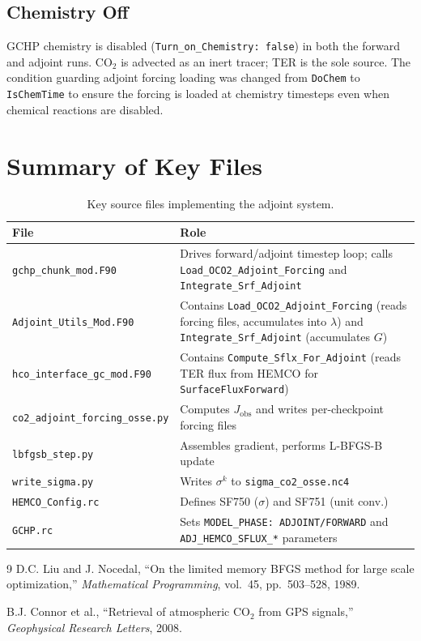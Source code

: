 \documentclass[12pt]{article}
\begin{document}
\subsection{Chemistry Off}

GCHP chemistry is disabled (\texttt{Turn\_on\_Chemistry: false}) in both the
forward and adjoint runs. CO$_2$ is advected as an inert tracer; TER is the
sole source. The condition guarding adjoint forcing loading was changed from
\texttt{DoChem} to \texttt{IsChemTime} to ensure the forcing is loaded at
chemistry timesteps even when chemical reactions are disabled.

\section{Summary of Key Files}

\begin{table}[h!]
\centering
\caption{Key source files implementing the adjoint system.}
\small
\begin{tabular}{lp{9cm}}
\toprule
File & Role \\
\midrule
\texttt{gchp\_chunk\_mod.F90} & Drives forward/adjoint timestep loop; calls
  \texttt{Load\_OCO2\_Adjoint\_Forcing} and \texttt{Integrate\_Srf\_Adjoint} \\
\texttt{Adjoint\_Utils\_Mod.F90} & Contains \texttt{Load\_OCO2\_Adjoint\_Forcing}
  (reads forcing files, accumulates into $\lambda$) and
  \texttt{Integrate\_Srf\_Adjoint} (accumulates $G$) \\
\texttt{hco\_interface\_gc\_mod.F90} & Contains \texttt{Compute\_Sflx\_For\_Adjoint}
  (reads TER flux from HEMCO for \texttt{SurfaceFluxForward}) \\
\texttt{co2\_adjoint\_forcing\_osse.py} & Computes $J_{\mathrm{obs}}$ and
  writes per-checkpoint forcing files \\
\texttt{lbfgsb\_step.py} & Assembles gradient, performs L-BFGS-B update \\
\texttt{write\_sigma.py} & Writes $\sigma^k$ to \texttt{sigma\_co2\_osse.nc4} \\
\texttt{HEMCO\_Config.rc} & Defines SF750 ($\sigma$) and SF751 (unit conv.) \\
\texttt{GCHP.rc} & Sets \texttt{MODEL\_PHASE: ADJOINT/FORWARD} and
  \texttt{ADJ\_HEMCO\_SFLUX\_*} parameters \\
\bottomrule
\end{tabular}
\end{table}

\begin{thebibliography}{9}
  D.C. Liu and J. Nocedal,
  ``On the limited memory BFGS method for large scale optimization,''
  \emph{Mathematical Programming}, vol.~45, pp.~503--528, 1989.

  B.J. Connor et al.,
  ``Retrieval of atmospheric CO$_2$ from GPS signals,''
  \emph{Geophysical Research Letters}, 2008.
\end{thebibliography}
\end{document}

